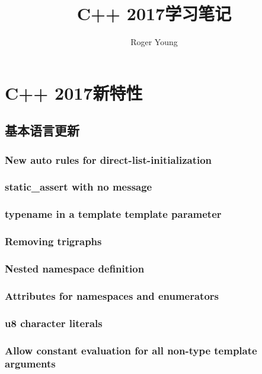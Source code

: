 \documentclass{book}
\author{Roger Young}
\title{C++ 2017学习笔记}
\begin{document}
	\maketitle
	\tableofcontents
	
\chapter{C++ 2017新特性}

\section{基本语言更新}

\subsection{New auto rules for direct-list-initialization}

\subsection{static\_assert with no message}

\subsection{typename in a template template parameter}

\subsection{Removing trigraphs}

\subsection{Nested namespace definition}

\subsection{Attributes for namespaces and enumerators}

\subsection{u8 character literals}

\subsection{Allow constant evaluation for all non-type template arguments}
\end{document}
